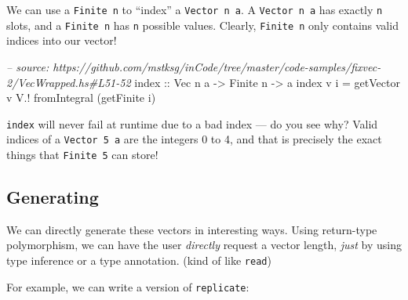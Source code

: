 \documentclass[]{article}
\newenvironment{Shaded}{}{}
\newcommand{\KeywordTok}[1]{\textcolor[rgb]{0.00,0.44,0.13}{\textbf{#1}}}
\newcommand{\DataTypeTok}[1]{\textcolor[rgb]{0.56,0.13,0.00}{#1}}
\newcommand{\CommentTok}[1]{\textcolor[rgb]{0.38,0.63,0.69}{\textit{#1}}}
\newcommand{\OtherTok}[1]{\textcolor[rgb]{0.00,0.44,0.13}{#1}}
\newcommand{\FunctionTok}[1]{\textcolor[rgb]{0.02,0.16,0.49}{#1}}
\newcommand{\NormalTok}[1]{#1}
\begin{document}
We can use a \texttt{Finite\ n} to ``index'' a \texttt{Vector\ n\ a}. A
\texttt{Vector\ n\ a} has exactly \texttt{n} slots, and a \texttt{Finite\ n} has
\texttt{n} possible values. Clearly, \texttt{Finite\ n} only contains valid
indices into our vector!

\begin{Shaded}
\begin{Highlighting}[]
\CommentTok{-- source: https://github.com/mstksg/inCode/tree/master/code-samples/fixvec-2/VecWrapped.hs#L51-52}
\NormalTok{index}\OtherTok{ ::} \DataTypeTok{Vec}\NormalTok{ n a }\OtherTok{->} \DataTypeTok{Finite}\NormalTok{ n }\OtherTok{->}\NormalTok{ a}
\NormalTok{index v i }\FunctionTok{=}\NormalTok{ getVector v }\FunctionTok{V.!}\NormalTok{ fromIntegral (getFinite i)}
\end{Highlighting}
\end{Shaded}

\texttt{index} will never fail at runtime due to a bad index --- do you see why?
Valid indices of a \texttt{Vector\ 5\ a} are the integers 0 to 4, and that is
precisely the exact things that \texttt{Finite\ 5} can store!

\subsection{Generating}\label{generating}

We can directly generate these vectors in interesting ways. Using return-type
polymorphism, we can have the user \emph{directly} request a vector length,
\emph{just} by using type inference or a type annotation. (kind of like
\texttt{read})

For example, we can write a version of \texttt{replicate}:

\begin{Shaded}
\end{Shaded}
\end{document}
